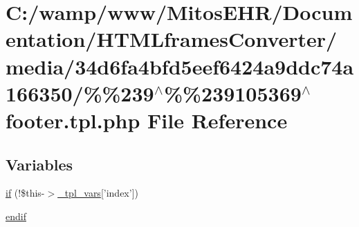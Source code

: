 \hypertarget{media_234d6fa4bfd5eef6424a9ddc74a166350_2_06_06239_05_06_06239105369_05footer_8tpl_8php}{\section{\-C\-:/wamp/www/\-Mitos\-E\-H\-R/\-Documentation/\-H\-T\-M\-Lframes\-Converter/media/34d6fa4bfd5eef6424a9ddc74a166350/\%\%239$^\wedge$\%\%239105369$^\wedge$footer.tpl.\-php \-File \-Reference}
\label{media_234d6fa4bfd5eef6424a9ddc74a166350_2_06_06239_05_06_06239105369_05footer_8tpl_8php}
}
\subsection*{\-Variables}
\begin{DoxyCompactItemize}
\item 
\hyperlink{media_234d6fa4bfd5eef6424a9ddc74a166350_2_06_06239_05_06_06239105369_05footer_8tpl_8php_ac88ce6836416eb9d767d617090a64744}{if} (!\$this-\/$>$\hyperlink{_06_06127_05_06_0612781687_05pkgelementindex_8tpl_8php_a4a4846d8e68d455590131a05697f67a3}{\-\_\-tpl\-\_\-vars}\mbox{[}'index'\mbox{]})
\item 
\hyperlink{media_234d6fa4bfd5eef6424a9ddc74a166350_2_06_06239_05_06_06239105369_05footer_8tpl_8php_a82cd33ca97ff99f2fcc5e9c81d65251b}{endif}
\end{DoxyCompactItemize}


